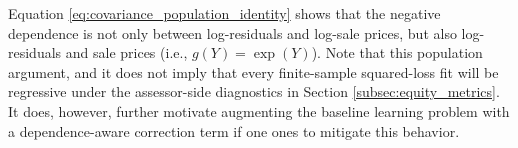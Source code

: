 \documentclass[12pt, draft]{article}
\theoremstyle{plain}
\theoremstyle{definition}
\newcommand{\E}{\mathbb{E}}
\newcommand{\1}{\mathbf{1}}
\newcommand{\Cov}{\text{Cov}}
\newcommand{\Var}{\text{Var}}
\begin{document}



Equation \eqref{eq:covariance_population_identity} shows that the negative dependence is not only between log-residuals and log-sale prices, but also log-residuals and sale prices (i.e., $g(Y)=\exp(Y)$). Note that this population argument, and it does not imply that every finite-sample squared-loss fit will be regressive under the assessor-side diagnostics in Section \ref{subsec:equity_metrics}. It does, however, further motivate augmenting the baseline learning problem with a dependence-aware correction term if one ones to mitigate this behavior.

\end{document}
